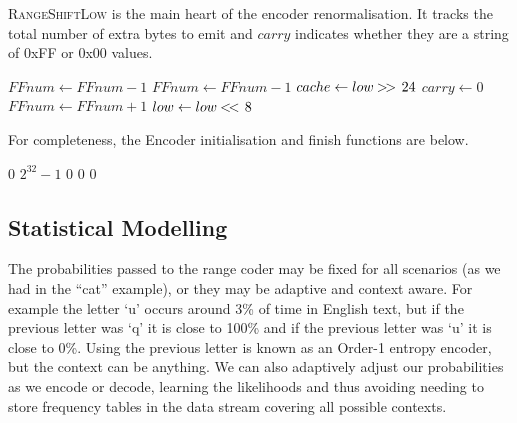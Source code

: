 \documentclass[a4paper]{article}
\begin{document}
\textsc{RangeShiftLow} is the main heart of the encoder renormalisation.
It tracks the total number of extra bytes to emit and $carry$ indicates whether they are a string of 0xFF or 0x00 values.

\begin{algorithmic}[1]
      \State {} 
        \State {}
        \State $FFnum \gets FFnum - 1$
      \EndWhile
    \Else
      \State {} 
        \State {}
        \State $FFnum \gets FFnum - 1$
      \EndWhile
    \EndIf
    \State $cache \gets low \mathbin{>\mkern-3mu>\,} 24$ 
    \State $carry \gets 0$
  \Else
    \State $FFnum \gets FFnum + 1$
  \EndIf
  \Statex
  \State $low \gets low \mathbin{<\mkern-3mu<\,} 8$
\EndProcedure
\end{algorithmic}

For completeness, the Encoder initialisation and finish functions are below.

\begin{algorithmic}[1]
  \settowidth{\maxwidth}{FFnum\ }
  \State {} $0$
  \State {} $2^{32}-1$
  \State {} $0$
  \State {} $0$
  \State {} $0$
\EndProcedure
\end{algorithmic}

\begin{algorithmic}[1]
   
    \State {}
  \EndFor
\EndProcedure
\end{algorithmic}


\subsection{Statistical Modelling}

The probabilities passed to the range coder may be fixed for all scenarios (as we had in the ``cat'' example), or they may be adaptive and context aware.
For example the letter `u' occurs around 3\% of time in English text, but if the previous letter was `q' it is close to 100\% and if the previous letter was `u' it is close to 0\%.
Using the previous letter is known as an Order-1 entropy encoder, but the context can be anything.
We can also adaptively adjust our probabilities as we encode or
decode, learning the likelihoods and thus avoiding needing to store
frequency tables in the data stream covering all possible contexts.
\end{document}
